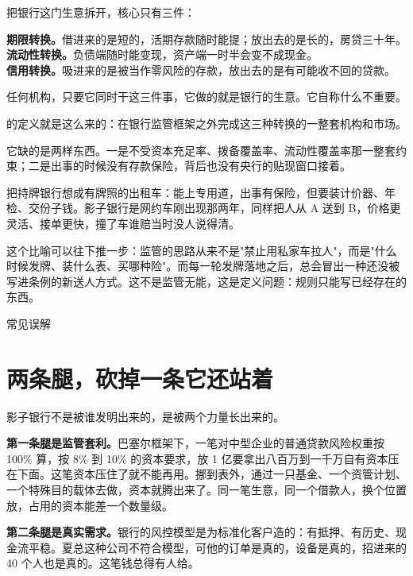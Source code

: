 把银行这门生意拆开，核心只有三件：

\textbf{期限转换。}借进来的是短的，活期存款随时能提；放出去的是长的，房贷三十年。\\ \textbf{流动性转换。}负债端随时能变现，资产端一时半会变不成现金。\\ \textbf{信用转换。}吸进来的是被当作零风险的存款，放出去的是有可能收不回的贷款。

任何机构，只要它同时干这三件事，它做的就是银行的生意。它自称什么不重要。

的定义就是这么来的：在银行监管框架之外完成这三种转换的一整套机构和市场。

它缺的是两样东西。一是不受资本充足率、拨备覆盖率、流动性覆盖率那一整套约束；二是出事的时候没有存款保险，背后也没有央行的贴现窗口接着。

把持牌银行想成有牌照的出租车：能上专用道，出事有保险，但要装计价器、年检、交份子钱。影子银行是网约车刚出现那两年，同样把人从 A 送到 B，价格更灵活、接单更快，撞了车谁赔当时没人说得清。

这个比喻可以往下推一步：监管的思路从来不是"禁止用私家车拉人"，而是"什么时候发牌、装什么表、买哪种险"。而每一轮发牌落地之后，总会冒出一种还没被写进条例的新送人方式。这不是监管无能，这是定义问题：规则只能写已经存在的东西。

\begin{mythbox}{常见误解}
\end{mythbox}

\section{两条腿，砍掉一条它还站着}

影子银行不是被谁发明出来的，是被两个力量长出来的。

\textbf{第一条腿是监管套利。}巴塞尔框架下，一笔对中型企业的普通贷款风险权重按 100\% 算，按 8\% 到 10\% 的资本要求，放 1 亿要拿出八百万到一千万自有资本压在下面。这笔资本压住了就不能再用。挪到表外，通过一只基金、一个资管计划、一个特殊目的载体去做，资本就腾出来了。同一笔生意，同一个借款人，换个位置放，占用的资本能差一个数量级。

\textbf{第二条腿是真实需求。}银行的风控模型是为标准化客户造的：有抵押、有历史、现金流平稳。夏总这种公司不符合模型，可他的订单是真的，设备是真的，招进来的 40 个人也是真的。这笔钱总得有人给。

